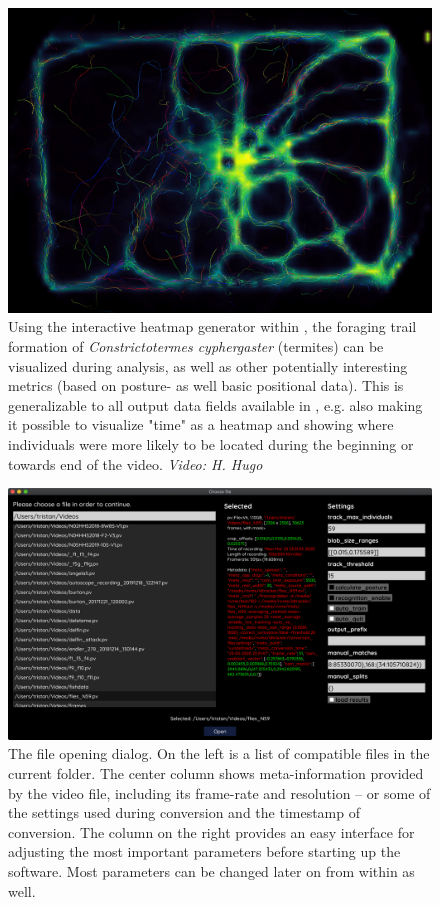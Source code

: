 \documentclass[9pt,lineno]{elife}
\newcommand{\TRex}{\protect\path{TRex}}
\begin{document}
\begin{figure}
\begin{fullwidth}
\includegraphics[width=1.0\linewidth]{012441.jpg}
\caption{Using the interactive heatmap generator within \TRex{}, the foraging trail formation of \textit{Constrictotermes cyphergaster} (termites) can be visualized during analysis, as well as other potentially interesting metrics (based on posture- as well basic positional data). This is generalizable to all output data fields available in \TRex{}, e.g. also making it possible to visualize "time" as a heatmap and showing where individuals were more likely to be located during the beginning or towards end of the video. \textit{Video: H. Hugo}}
\label{fig:trex_screenshot_heatmaps}
\end{fullwidth}
\end{figure}

\begin{figure}[t]
    \centering
   \includegraphics[width=\textwidth]{Screenshot 2020-06-01 at 18.31.36.png}
    \caption{The file opening dialog. On the left is a list of compatible files in the current folder. The center column shows meta-information provided by the video file, including its frame-rate and resolution -- or some of the settings used during conversion and the timestamp of conversion. The column on the right provides an easy interface for adjusting the most important parameters before starting up the software. Most parameters can be changed later on from within \TRex{} as well.}
	\label{fig:file_opening}
\end{figure}
\end{document}
